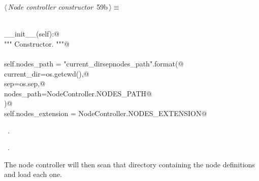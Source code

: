 \documentclass[
    a4paper,      %
    10pt,         %
    openright,    %
    notitlepage,  %
    parskip=half, %
]{scrreprt}       %
\theoremstyle{definition}                    %
\begin{document}
\begin{flushleft} \small
\begin{minipage}{\linewidth}\label{scrap98}\raggedright\small
{} $\langle\,${\itshape Node controller constructor}\nobreak\ {\footnotesize {59b}}$\,\rangle\equiv$
\vspace{-1exm}
\begin{list}{}{} \item
\mbox{}\lstinline@@\\
\mbox{}\lstinline@def __init__(self):@\\
\mbox{}\lstinline@    """ Constructor. """@\\
\mbox{}\lstinline@@\\
\mbox{}\lstinline@    self.nodes_path = "{current_dir}{sep}{nodes_path}".format(@\\
\mbox{}\lstinline@        current_dir=os.getcwd(),@\\
\mbox{}\lstinline@        sep=os.sep,@\\
\mbox{}\lstinline@        nodes_path=NodeController.NODES_PATH@\\
\mbox{}\lstinline@    )@\\
\mbox{}\lstinline@    self.nodes_extension = NodeController.NODES_EXTENSION@{\NWsep}
\end{list}
\vspace{-1.5ex}
\footnotesize
\begin{list}{}{\setlength{\itemsep}{-\parsep}\setlength{\itemindent}{-\leftmargin}}
\item \NWtxtMacroDefBy\ .
\item \NWtxtMacroRefIn\ .

\item{}
\end{list}
\end{minipage}\vspace{4ex}
\end{flushleft}
The node controller will then scan that directory containing the node
definitions and load each one.
\end{document}
